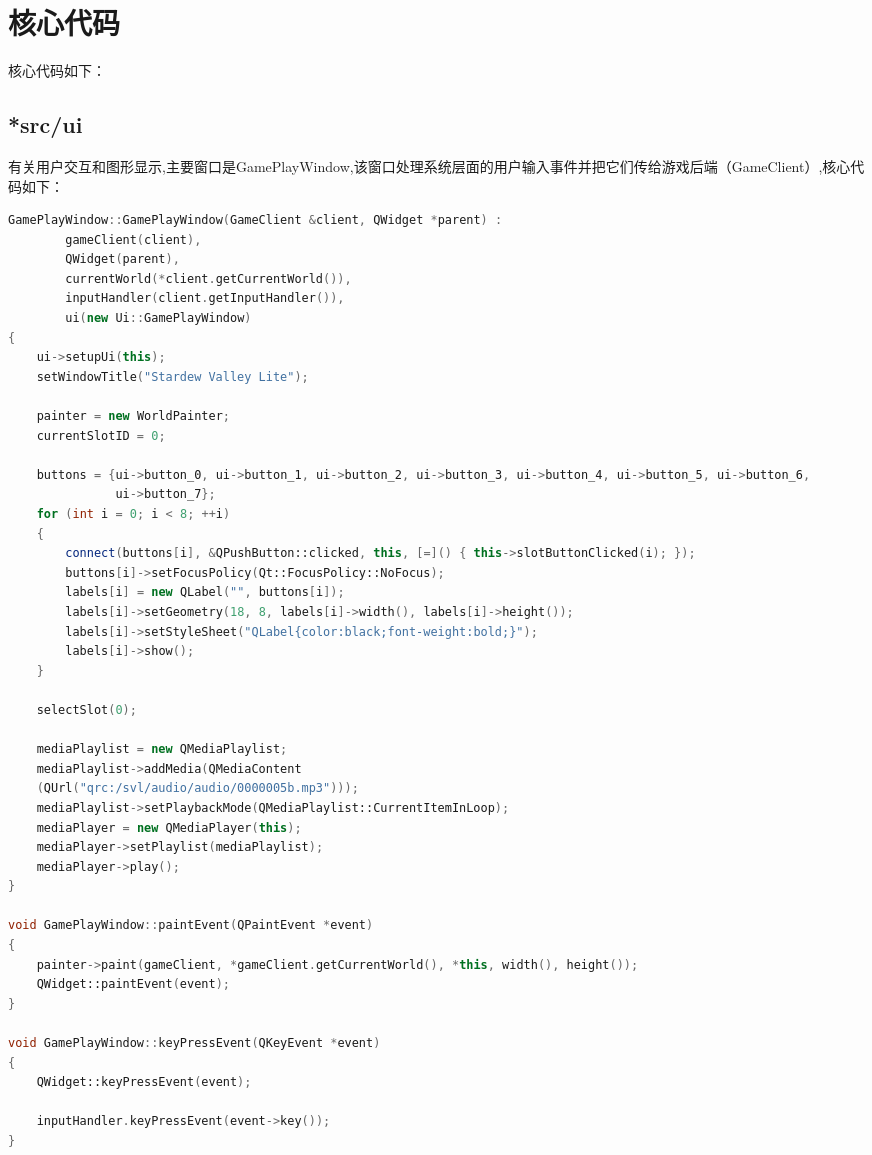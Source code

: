 \documentclass[a4paper,12pt]{report}
\begin{document}
\section{核心代码}
\songti
\begin{spacing}{1.5}
核心代码如下：\\
\subsection{\textbf{*src/ui}}
有关用户交互和图形显示,主要窗口是GamePlayWindow,该窗口处理系统层面的用户输入事件并把它们传给游戏后端（GameClient）,核心代码如下：\\
\begin{lstlisting}[language={C++}]
GamePlayWindow::GamePlayWindow(GameClient &client, QWidget *parent) :
        gameClient(client),
        QWidget(parent),
        currentWorld(*client.getCurrentWorld()),
        inputHandler(client.getInputHandler()),
        ui(new Ui::GamePlayWindow)
{
    ui->setupUi(this);
    setWindowTitle("Stardew Valley Lite");

    painter = new WorldPainter;
    currentSlotID = 0;

    buttons = {ui->button_0, ui->button_1, ui->button_2, ui->button_3, ui->button_4, ui->button_5, ui->button_6,
               ui->button_7};
    for (int i = 0; i < 8; ++i)
    {
        connect(buttons[i], &QPushButton::clicked, this, [=]() { this->slotButtonClicked(i); });
        buttons[i]->setFocusPolicy(Qt::FocusPolicy::NoFocus);
        labels[i] = new QLabel("", buttons[i]);
        labels[i]->setGeometry(18, 8, labels[i]->width(), labels[i]->height());
        labels[i]->setStyleSheet("QLabel{color:black;font-weight:bold;}");
        labels[i]->show();
    }

    selectSlot(0);

    mediaPlaylist = new QMediaPlaylist;
    mediaPlaylist->addMedia(QMediaContent
    (QUrl("qrc:/svl/audio/audio/0000005b.mp3")));
    mediaPlaylist->setPlaybackMode(QMediaPlaylist::CurrentItemInLoop);
    mediaPlayer = new QMediaPlayer(this);
    mediaPlayer->setPlaylist(mediaPlaylist);
    mediaPlayer->play();
}

void GamePlayWindow::paintEvent(QPaintEvent *event)
{
    painter->paint(gameClient, *gameClient.getCurrentWorld(), *this, width(), height());
    QWidget::paintEvent(event);
}

void GamePlayWindow::keyPressEvent(QKeyEvent *event)
{
    QWidget::keyPressEvent(event);

    inputHandler.keyPressEvent(event->key());
}


\end{lstlisting}
\end{spacing}
\end{document}
